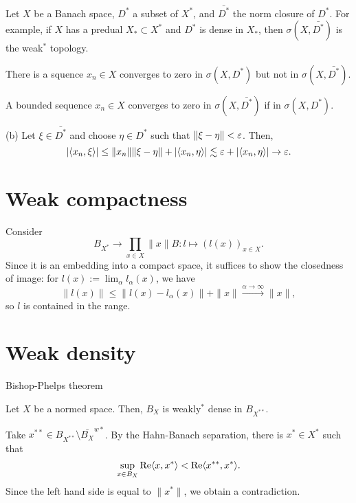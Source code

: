 \documentclass{../../large}
\begin{document}
\begin{prb}
Let $X$ be a Banach space, $D^*$ a subset of $X^*$, and $\bar{D^*}$ the norm closure of $D^*$.
For example, if $X$ has a predual $X_*\subset X^*$ and $D^*$ is dense in $X_*$, then $\sigma(X,\bar{D^*})$ is the weak$^*$ topology.
\begin{parts}
\item There is a squence $x_n\in X$ converges to zero in $\sigma(X,D^*)$ but not in $\sigma(X,\bar{D^*})$.
\item A bounded sequence $x_n\in X$ converges to zero in $\sigma(X,\bar{D^*})$ if in $\sigma(X,D^*)$.
\end{parts}
\end{prb}
\begin{pf}
(b)
Let $\xi\in\bar{D^*}$ and choose $\eta\in D^*$ such that $\|\xi-\eta\|<\varepsilon$.
Then,
\[|\langle x_n,\xi\rangle|\le\|x_n\|\|\xi-\eta\|+|\langle x_n,\eta\rangle|\lesssim\varepsilon+|\langle x_n,\eta\rangle|\to\varepsilon.\]
\end{pf}



\section{Weak compactness}
\begin{prb}
\end{prb}
\begin{pf}
Consider
\[B_{X^*}\to\prod_{x\in X}\|x\|B:l\mapsto(l(x))_{x\in X}.\]
Since it is an embedding into a compact space, it suffices to show the closedness of image: for $l(x):=\lim_\alpha l_\alpha(x)$, we have
\[\|l(x)\|\le\|l(x)-l_\alpha(x)\|+\|x\|\xrightarrow{\alpha\to\infty}\|x\|,\]
so $l$ is contained in the range.
\end{pf}
\begin{prb}
\end{prb}
\begin{prb}
\end{prb}

\section{Weak density}
Bishop-Phelps theorem

\begin{prb}
Let $X$ be a normed space.
Then, $B_X$ is weakly$^*$ dense in $B_{X^{**}}$.
\end{prb}
\begin{pf}
Take $x^{**}\in B_{X^{**}}\setminus\bar{B_X}^{w*}$.
By the Hahn-Banach separation, there is $x^*\in X^*$ such that
\[\sup_{x\in B_X}\operatorname{Re}\langle x,x^*\rangle<\operatorname{Re}\langle x^{**},x^*\rangle.\]
Since the left hand side is equal to $\|x^*\|$, we obtain a contradiction.
\end{pf}
\end{document}
